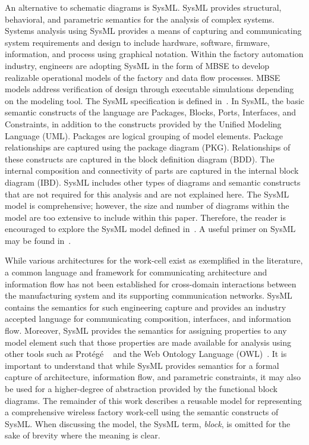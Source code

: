 \documentclass[journal, twoside]{IEEEtran}
\begin{document}
    An alternative to schematic diagrams is SysML. SysML provides structural, behavioral, and parametric semantics for the analysis of complex systems.  Systems analysis using SysML provides a means of capturing and communicating system requirements and design to include hardware, software, firmware, information, and process using graphical notation.  Within the factory automation industry, engineers are adopting SysML in the form of MBSE to develop realizable operational models of the factory and data flow processes.  MBSE models address verification of design through executable simulations depending on the modeling tool.  The SysML specification is defined in~\cite{SysML2017}.  In SysML, the basic semantic constructs of the language are Packages, Blocks, Ports, Interfaces, and Constraints, in addition to the constructs provided by the Unified Modeling Language (UML). Packages are logical grouping of model elements. Package relationships are captured using the package diagram (PKG). Relationships of these constructs are captured in the block definition diagram (BDD).  The internal composition and connectivity of parts are captured in the internal block diagram (IBD). SysML includes other types of diagrams and semantic constructs that are not required for this analysis and are not explained here. The SysML model is comprehensive; however, the size and number of diagrams within the model are too extensive to include within this paper.  Therefore, the reader is encouraged to explore the SysML model defined in~\cite{SysML.Candell2018}.  A useful primer on SysML may be found in~\cite{Friedenthal2015.SysML}.  
    
 	While various architectures for the work-cell exist as exemplified in the literature, a common language and framework for communicating architecture and information flow has not been established for cross-domain interactions between the manufacturing system and its supporting communication networks.  SysML contains the semantics for such engineering capture and provides an industry accepted language for communicating composition, interfaces, and information flow. Moreover, SysML provides the semantics for assigning properties to any model element such that those properties are made  available for analysis using other tools such as Prot\'eg\'e ~\cite{StanfordUniversity.Protege} and the Web Ontology Language (OWL)~\cite{W3C2012.OWL}. It is important to understand that while SysML provides semantics for a formal capture of architecture, information flow, and parametric constraints, it may also be used for a higher-degree of abstraction provided by the functional block diagrams.  The remainder of this work describes a reusable model for representing a comprehensive wireless factory work-cell using the semantic constructs of SysML. When discussing the model, the SysML term, \textit{block}, is omitted for the sake of brevity where the meaning is clear.
	
\end{document}
